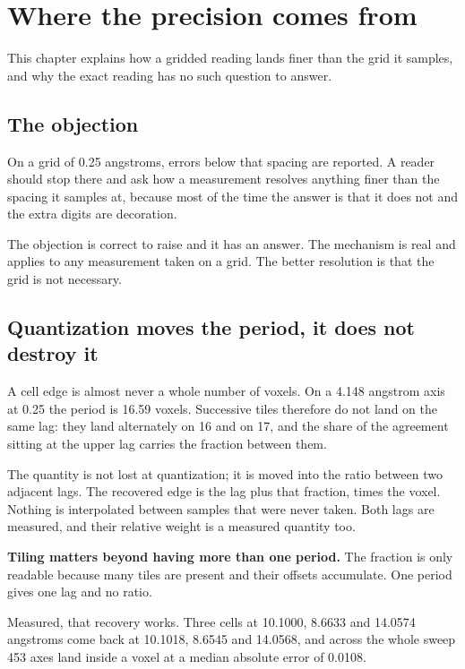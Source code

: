 \chapter{Where the precision comes from}

This chapter explains how a gridded reading lands finer than the grid it samples, and why the exact reading has no such question to answer.

\section{The objection}

On a grid of 0.25 angstroms, errors below that spacing are reported. A reader should stop there and ask how a measurement resolves anything finer than the spacing it samples at, because most of the time the answer is that it does not and the extra digits are decoration.

The objection is correct to raise and it has an answer. The mechanism is real and applies to any measurement taken on a grid. The better resolution is that the grid is not necessary.

\section{Quantization moves the period, it does not destroy it}

A cell edge is almost never a whole number of voxels. On a 4.148 angstrom axis at 0.25 the period is 16.59 voxels. Successive tiles therefore do not land on the same lag: they land alternately on 16 and on 17, and the share of the agreement sitting at the upper lag carries the fraction between them.

The quantity is not lost at quantization; it is moved into the ratio between two adjacent lags. The recovered edge is the lag plus that fraction, times the voxel. Nothing is interpolated between samples that were never taken. Both lags are measured, and their relative weight is a measured quantity too.

\textbf{Tiling matters beyond having more than one period.} The fraction is only readable because many tiles are present and their offsets accumulate. One period gives one lag and no ratio.

Measured, that recovery works. Three cells at 10.1000, 8.6633 and 14.0574 angstroms come back at 10.1018, 8.6545 and 14.0568, and across the whole sweep 453 axes land inside a voxel at a median absolute error of 0.0108.

